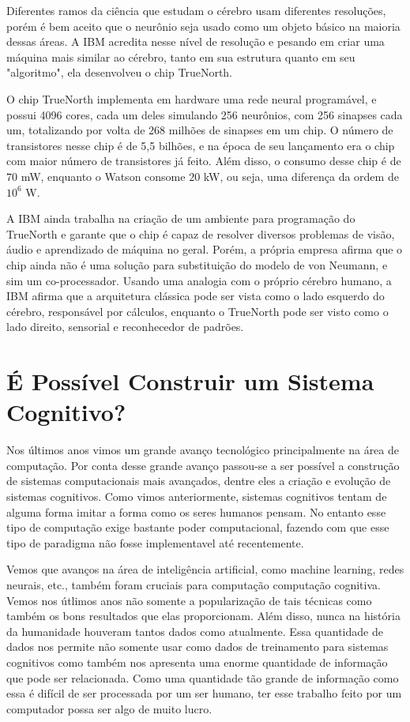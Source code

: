 \documentclass[12pt]{article}
\begin{document}
Diferentes ramos da ciência que estudam o cérebro usam diferentes 
resoluções, porém é bem aceito que o neurônio seja usado como um objeto
básico na maioria dessas áreas. A IBM acredita nesse nível de resolução
e pesando em criar uma máquina mais similar ao cérebro, tanto em sua
estrutura quanto em seu "algoritmo", ela desenvolveu o chip TrueNorth.

O chip TrueNorth implementa em hardware uma rede neural programável, e 
possui 4096 cores, cada um deles simulando 256 neurônios, com 256
sinapses cada um, totalizando por volta de 268 milhões de sinapses em
um chip. O número de transistores nesse chip é de 5,5 bilhões, e na 
época de seu lançamento era o chip com maior número de transistores já
feito. Além disso, o consumo desse chip é de $70$ mW, enquanto
o Watson consome $20$ kW, ou seja, uma diferença da ordem de $10 ^ 6$ W.

A IBM ainda trabalha na criação de um ambiente para programação do 
TrueNorth e garante que o chip é capaz de resolver diversos problemas
de visão, áudio e aprendizado de máquina no geral. Porém, a própria
empresa afirma que o chip ainda não é uma solução para substituição do
modelo de von Neumann, e sim um co-processador. Usando uma analogia com
o próprio cérebro humano, a IBM afirma que a arquitetura clássica pode
ser vista como o lado esquerdo do cérebro, responsável por cálculos,
enquanto o TrueNorth pode ser visto como o lado direito, sensorial e
reconhecedor de padrões.

\pagebreak
\section{É Possível Construir um Sistema Cognitivo?}
Nos últimos anos vimos um grande avanço tecnológico principalmente na
área de computação. Por conta desse grande avanço passou-se a ser possível
a construção de sistemas computacionais mais avançados, dentre eles a
criação e evolução de sistemas cognitivos. Como vimos anteriormente, 
sistemas cognitivos tentam de alguma forma imitar a forma como os seres
humanos pensam. No entanto esse tipo de computação exige bastante poder
computacional, fazendo com que esse tipo de paradigma não fosse 
implementavel até recentemente.

Vemos que avanços na área de inteligência artificial, como 
machine learning, redes neurais, etc.,  também foram cruciais para
computação computação cognitiva. Vemos nos útlimos anos não somente a
popularização de tais técnicas como também os bons resultados que 
elas proporcionam. Além disso, nunca na história da humanidade houveram
tantos dados como atualmente. Essa quantidade de dados nos permite não
somente usar como dados de treinamento para sistemas cognitivos como
também nos apresenta uma enorme quantidade de informação que pode ser 
relacionada. Como uma quantidade tão grande de informação como essa é
difícil de ser processada por um ser humano, ter esse trabalho feito
por um computador possa ser algo de muito lucro.
\end{document}

